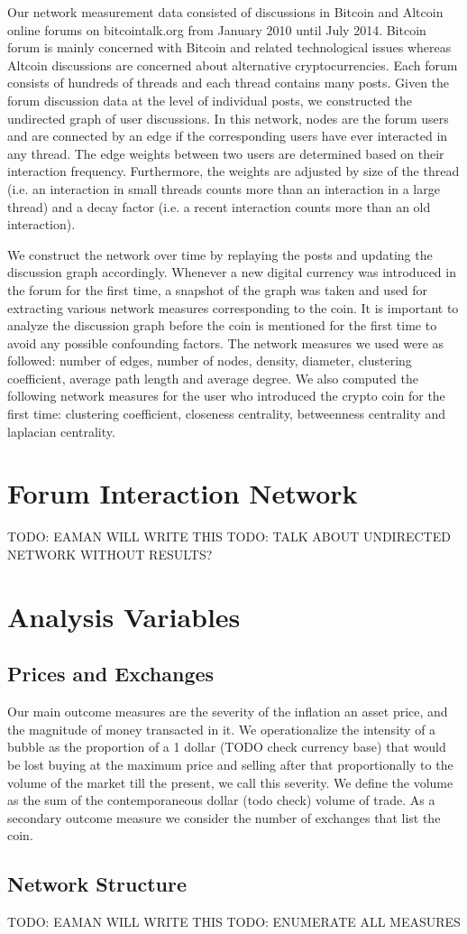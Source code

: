 Our network measurement data consisted of discussions in Bitcoin and Altcoin
online forums on bitcointalk.org from January 2010 until July 2014.  Bitcoin
forum is mainly concerned with Bitcoin and related technological issues whereas
Altcoin discussions are concerned about alternative cryptocurrencies. Each
forum consists of hundreds of threads and each thread contains many posts.
Given the forum discussion data at the level of individual posts, we
constructed the undirected graph of user discussions. In this network, nodes
are the forum users and are connected by an edge if the corresponding users
have ever interacted in any thread. The edge weights between two users are
determined based on their interaction frequency. Furthermore, the weights are
adjusted by size of the thread (i.e. an interaction in small threads counts
more than an interaction in a large thread) and a decay factor (i.e. a recent
interaction counts more than an old interaction).

We construct the network over time by replaying the posts and updating the
discussion graph accordingly.  Whenever a new digital currency was introduced
in the forum for the first time, a snapshot of the graph was taken and used for
extracting various network measures corresponding to the coin. It is important
to analyze the discussion graph before the coin is mentioned for the first time
to avoid any possible confounding factors. The network measures we used were as
followed: number of edges, number of nodes, density, diameter, clustering
coefficient, average path length and average degree. We also computed the
following network measures for the user who introduced the crypto coin for the
first time: clustering coefficient, closeness centrality, betweenness
centrality and laplacian centrality.

\section{Forum Interaction Network}
TODO: EAMAN WILL WRITE THIS
TODO: TALK ABOUT UNDIRECTED NETWORK WITHOUT RESULTS?



\section{Analysis Variables}
\subsection{Prices and Exchanges}
Our main outcome measures are the severity of the inflation an asset price, and the magnitude of money transacted in it.
We operationalize the intensity of a bubble as the proportion of a 1 dollar (TODO check currency base) that would be lost buying at the maximum price and selling after that proportionally to the volume of the market till the present, we call this severity.
We define the volume as the sum of the contemporaneous dollar (todo check) volume of trade.
As a secondary outcome measure we consider the number of exchanges that list the coin.


\subsection{Network Structure}
TODO: EAMAN WILL WRITE THIS
TODO: ENUMERATE ALL MEASURES
